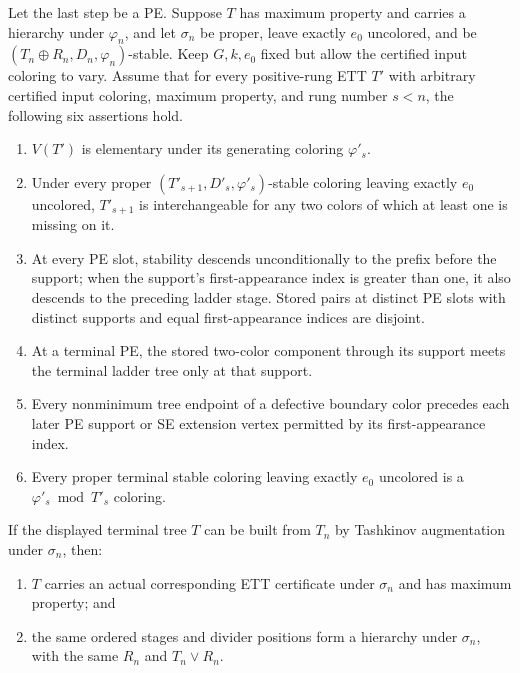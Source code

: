 \begin{lemma}
Let the last step be a PE.  Suppose $T$ has maximum property and carries
a hierarchy under $\varphi_n$, and let $\sigma_n$ be proper, leave
exactly $e_0$ uncolored, and be
$(T_n\oplus R_n,D_n,\varphi_n)$-stable.  Keep $G,k,e_0$ fixed but
allow the certified input coloring to vary.  Assume that for every
positive-rung ETT $T'$ with arbitrary certified input coloring, maximum
property, and rung number $s<n$, the following six assertions hold.
\begin{enumerate}
\item $V(T')$ is elementary under its generating coloring
$\varphi'_s$.
\item Under every proper $(T'_{s+1},D'_s,\varphi'_s)$-stable coloring
leaving exactly $e_0$ uncolored, $T'_{s+1}$ is interchangeable for any
two colors of which at least one is missing on it.
\item At every PE slot, stability descends unconditionally to the prefix before the
support; when the support's first-appearance index is greater than one, it
also descends to the preceding ladder stage.  Stored pairs at distinct PE slots with distinct supports
and equal first-appearance indices are disjoint.
\item At a terminal PE, the stored two-color component through its
support meets the terminal ladder tree only at that support.
\item Every nonminimum tree endpoint of a defective boundary color
precedes each later PE support or SE extension vertex permitted by its
first-appearance index.
\item Every proper terminal stable coloring leaving exactly $e_0$
uncolored is a $\varphi'_s\bmod T'_s$ coloring.
\end{enumerate}
If the displayed terminal tree $T$ can be built from $T_n$ by Tashkinov
augmentation under $\sigma_n$, then:
\begin{enumerate}
\item $T$ carries an actual corresponding ETT certificate under
$\sigma_n$ and has maximum property; and
\item the same ordered stages and divider positions form a hierarchy
under $\sigma_n$, with the same $R_n$ and $T_n\vee R_n$.
\end{enumerate}
\end{lemma}
